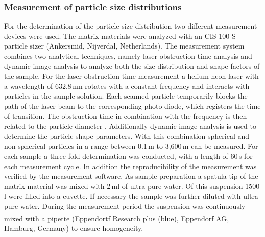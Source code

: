 \subsubsection{Measurement of particle size distributions}
\label{subsubsec:part_dist_meas}
For the determination of the particle size distribution two different measurement devices were used. The matrix materials were analyzed with an CIS 100-S particle sizer (Ankersmid, Nijverdal, Netherlands). The measurement system combines two analytical techniques, namely laser obstruction time analysis and dynamic image analysis to analyze both the size distribution and shape factors of the sample. For the laser obstruction time measurement a helium-neon laser with a wavelength of 632,8\,nm rotates with a constant frequency and interacts with particles in the sample solution. Each scanned particle temporarily blocks the path of the laser beam to the corresponding photo diode, which registers the time of transition. The obstruction time in combination with the frequency is then related to the particle diameter \cite{neis1997particle}. Additionally dynamic image analysis is used to determine the particle shape parameters. With this combination spherical and non-spherical particles in a range between 0.1\,\textmu m to 3,600\,\textmu m can be measured. For each sample a three-fold determination was conducted, with a length of 60\,s for each measurement cycle. In addition the reproducibility of the measurement was verified by the measurement software. As sample preparation a spatula tip of the matrix material was mixed with 2\,ml of ultra-pure water. Of this suspension 1500\,\textmu l were filled into a cuvette. If necessary the sample was further diluted with ultra-pure water. During the measurement period the suspension was continuously mixed with a pipette (Eppendortf Research \textsuperscript{\textregistered} plus (blue), Eppendorf AG, Hamburg, Germany) to ensure homogeneity. \\
\\
